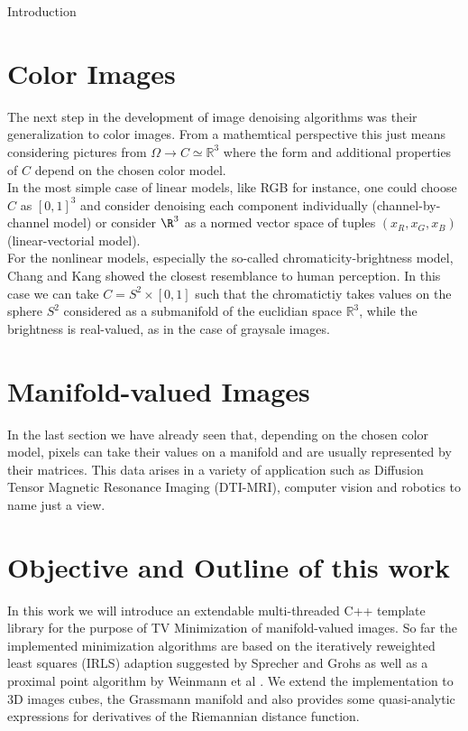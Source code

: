 \begin{chapter}{Introduction}
\section{Color Images}
The next step in the development of image denoising algorithms was their generalization to color images. From a mathemtical perspective this just means considering pictures
from $\Omega\to C\simeq \mathbb{R}^3$ where the form and additional properties of $C$ depend on the chosen color model. \\
In the most simple case of linear models, like RGB for instance, one could choose $C$ as $[0,1]^3$ and consider denoising each component individually (channel-by-channel model)
or consider $\R^3$ as a normed vector space of tuples $(x_R, x_G, x_B)$ (linear-vectorial model).\\
For the nonlinear models, especially the so-called chromaticity-brightness model, Chang and Kang \cite{ChangKuang} showed the closest resemblance to human perception.
In this case we can take $C=S^2\times [0,1]$ such that the chromatictiy takes values on the sphere $S^2$ considered as a submanifold of the euclidian space $\mathbb{R}^3$, 
while the brightness is real-valued, as in the case of graysale images.

\section{Manifold-valued Images} %
\label{sec:Manifold-valued Images}
In the last section we have already seen that, depending on the chosen color model, pixels can take their values on a manifold and are usually represented by their matrices.
This data arises in a variety of application such as Diffusion Tensor Magnetic Resonance Imaging (DTI-MRI), computer vision and robotics to name just a view.

\section{Objective and Outline of this work}
In this work we will introduce an extendable multi-threaded C++ template library for the purpose of TV Minimization of manifold-valued images. 
So far the implemented minimization algorithms are based on the iteratively reweighted least squares (IRLS) adaption suggested by Sprecher and Grohs \cite{SprecherIRLS} as well as a 
proximal point algorithm by Weinmann et al \cite{WeinmannPRPT}. We extend the implementation to 3D images cubes, the Grassmann manifold and also provides some quasi-analytic expressions
for derivatives of the Riemannian distance function.\\


\end{chapter}
